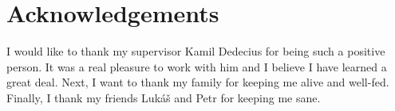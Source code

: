 \chapter*{Acknowledgements}

I would like to thank my supervisor Kamil Dedecius for being such a positive person. It was a real pleasure to work with him and I believe I have learned a great deal. Next, I want to thank my family for keeping me alive and well-fed. Finally, I thank my friends Luk\'a\v{s} and Petr for keeping me sane.